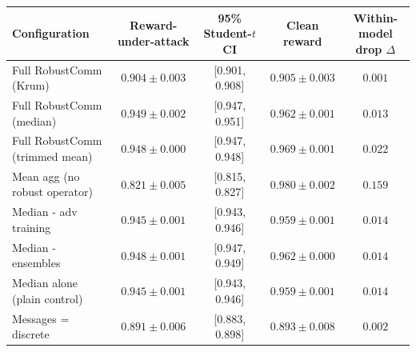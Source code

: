 \begin{tabular}{@{}lcccc@{}}
\toprule
Configuration & Reward-under-attack & 95\% Student-$t$ CI & Clean reward & Within-model drop $\Delta$ \\
\midrule
Full RobustComm (Krum) & $0.904 \pm 0.003$ & [0.901, 0.908] & $0.905 \pm 0.003$ & $0.001$ \\
Full RobustComm (median) & $0.949 \pm 0.002$ & [0.947, 0.951] & $0.962 \pm 0.001$ & $0.013$ \\
Full RobustComm (trimmed mean) & $0.948 \pm 0.000$ & [0.947, 0.948] & $0.969 \pm 0.001$ & $0.022$ \\
Mean agg (no robust operator) & $0.821 \pm 0.005$ & [0.815, 0.827] & $0.980 \pm 0.002$ & $0.159$ \\
Median - adv training & $0.945 \pm 0.001$ & [0.943, 0.946] & $0.959 \pm 0.001$ & $0.014$ \\
Median - ensembles & $0.948 \pm 0.001$ & [0.947, 0.949] & $0.962 \pm 0.000$ & $0.014$ \\
Median alone (plain control) & $0.945 \pm 0.001$ & [0.943, 0.946] & $0.959 \pm 0.001$ & $0.014$ \\
Messages = discrete & $0.891 \pm 0.006$ & [0.883, 0.898] & $0.893 \pm 0.008$ & $0.002$ \\
\bottomrule
\end{tabular}
